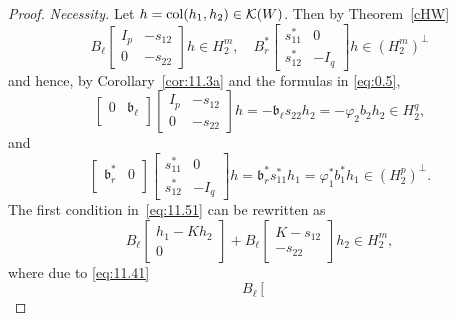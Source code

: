 \documentclass[12pt,twoside,a4paper]{amsart}
\theoremstyle{definition}
\numberwithin{equation}{section}
\begin{document}
\begin{proof}
{\it Necessity.}  Let $h=\textup{col}(h_1,h_2)\in{{\mathcal K}}(W)$.
Then by Theorem~\ref{cHW}
\begin{equation}\label{eq:11.51}
    B_{\ell}\left[\begin{array}{cc}
  I_p & -s_{12} \\
  0 & -s_{22}
\end{array}  \right]h\in H_2^m,\quad
B_r^*\left[\begin{array}{cc}
  s_{11}^* & 0 \\
  s_{12}^* & -I_q
\end{array}  \right]h\in (H_2^m)^\perp
\end{equation}
and hence, by Corollary~\ref{cor:11.3a} and the formulas in \eqref{eq:0.5},
\begin{equation}
\label{eq:jun4a8}
\left[
  \begin{array}{cc}
    0 & {{\mathfrak b}}_\ell \\
  \end{array}
\right]
\left[\begin{array}{cc}
  I_p & -s_{12} \\
  0 & -s_{22}
\end{array}  \right]h=-{{\mathfrak b}}_\ell s_{22}h_2=-\varphi_2b_2h_2\in H_2^q,
\end{equation}
and
\begin{equation}
\label{eq:jun4b8}
\left[
  \begin{array}{cc}
    {{\mathfrak b}}_r^* & 0 \\
  \end{array}
\right]
\left[\begin{array}{cc}
  s_{11}^* & 0 \\
  s_{12}^* & -I_q
\end{array}  \right]h={{\mathfrak b}}_r^*s_{11}^* h_1=\varphi_1^* b_1^* h_1
\in (H_2^p)^\perp.
\end{equation}
The first condition in~\eqref{eq:11.51} can be rewritten as
\[
     B_{\ell}\left[\begin{array}{cc}
  h_1-Kh_2 \\
  0
\end{array}  \right]+  B_{\ell}\left[\begin{array}{cc}
  K-s_{12} \\
   -s_{22}
\end{array}  \right]h_2\in H_2^m,
\]
where due to \eqref{eq:11.41}
\begin{equation}
\label{eq:jun4e8} B_{\ell}\left[\begin{array}{cc}

\end{array}
\end{equation}
\end{proof}
\end{document}
